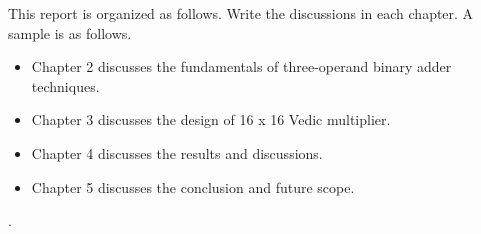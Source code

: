 This report is organized as follows. Write the discussions in each chapter. A sample is as follows.
\begin{itemize}
\item Chapter 2 discusses the fundamentals of three-operand binary adder techniques.
\item Chapter 3 discusses the design of 16 x 16 Vedic multiplier.
\item Chapter 4 discusses the results and discussions.
\item Chapter 5 discusses the conclusion and future scope.
\end{itemize}

.